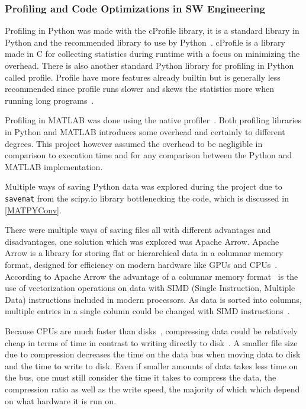 \documentclass[12pt, a4paper]{article}
\begin{document}
\subsubsection{Profiling and Code Optimizations in SW Engineering}
Profiling in Python was made with the cProfile library,
it is a standard library in Python and the recommended library to use by Python~\cite{Py:cProfile}.
cProfile is a library made in C for collecting statistics during runtime with a focus on minimizing the overhead.
There is also another standard Python library for profiling in Python called profile.
Profile have more features already builtin but is generally less recommended since profile runs slower and skews the statistics more when running long programs~\cite{Py:cProfile}.

Profiling in MATLAB was done using the native profiler~\cite{matProfile}.
Both profiling libraries in Python and MATLAB introduces some overhead and certainly to different degrees.
This project however assumed the overhead to be negligible in comparison to execution time and for any comparison between the Python and MATLAB implementation.%


Multiple ways of saving Python data was explored during the project due to \texttt{savemat} from the scipy.io library bottlenecking the code, which is discussed in \cref{MATPYConv}.


There were multiple ways of saving files all with different advantages and disadvantages, one solution which was explored was Apache Arrow.
Apache Arrow is a library for storing flat or hierarchical data in a columnar memory format, designed for efficiency on modern hardware like GPUs and CPUs~\cite{AA:apacheArrow}.
According to Apache Arrow the advantage of a columnar memory format~\cite{enwiki:columnarData} is the use of vectorization operations on data with SIMD (Single Instruction, Multiple Data) instructions included in modern processors.
As data is sorted into columns, multiple entries in a single column could be changed with SIMD instructions~\cite{AA:Overview}.


Because CPUs are much faster than disks~\cite{DiskSlow}, compressing data could be relatively cheap in terms of time in contrast to writing directly to disk~\cite{1607248}.
A smaller file size due to compression decreases the time on the data bus when moving data to disk and the time to write to disk.
Even if smaller amounts of data takes less time on the bus, one must still consider the time it takes to compress the data, the compression ratio as well as the write speed, the majority of which which depend on what hardware it is run on.
\end{document}

